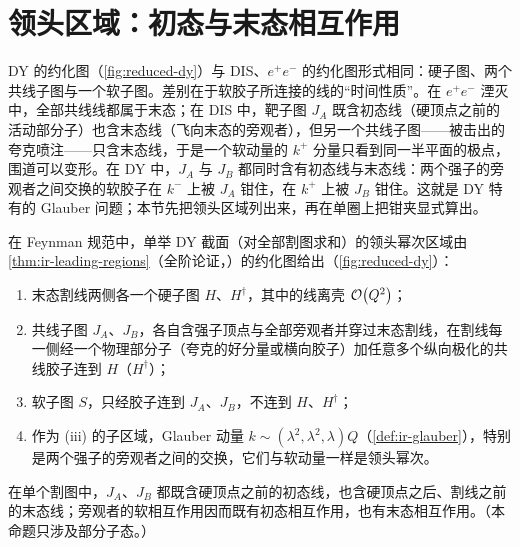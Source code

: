 \section{领头区域：初态与末态相互作用}\label{sec:dy-regions}

DY 的约化图（\cref{fig:reduced-dy}）与 DIS、$e^+e^-$ 的约化图形式相同：硬子图、两个共线子图与一个软子图。差别在于软胶子所连接的线的“时间性质”。在 $e^+e^-$ 湮灭中，全部共线线都属于末态；在 DIS 中，靶子图 $J_A$ 既含初态线（硬顶点之前的活动部分子）也含末态线（飞向末态的旁观者），但另一个共线子图——被击出的夸克喷注——只含末态线，于是一个软动量的 $k^+$ 分量只看到同一半平面的极点，围道可以变形。在 DY 中，$J_A$ 与 $J_B$ 都同时含有初态线与末态线：两个强子的旁观者之间交换的软胶子在 $k^-$ 上被 $J_A$ 钳住，在 $k^+$ 上被 $J_B$ 钳住。这就是 DY 特有的 Glauber 问题；本节先把领头区域列出来，再在单圈上把钳夹显式算出。

\begin{proposition}\label{prop:dy-regions}
在 Feynman 规范中，单举 DY 截面（对全部割图求和）的领头幂次区域由\cref{thm:ir-leading-regions}（全阶论证，\tagA）的约化图给出（\cref{fig:reduced-dy}）：
\begin{enumerate}[label=(\roman*),leftmargin=2.2em,itemsep=1pt,topsep=2pt]
\item 末态割线两侧各一个硬子图 $H$、$H^\dagger$，其中的线离壳 $\mathcal{O}\!\left(Q^2\right)$；
\item 共线子图 $J_A$、$J_B$，各自含强子顶点与全部旁观者并穿过末态割线，在割线每一侧经一个物理部分子（夸克的好分量或横向胶子）加任意多个纵向极化的共线胶子连到 $H$（$H^\dagger$）；
\item 软子图 $S$，只经胶子连到 $J_A$、$J_B$，不连到 $H$、$H^\dagger$；
\item 作为 (iii) 的子区域，Glauber 动量 $k\sim(\lambda^2,\lambda^2,\lambda)Q$（\cref{def:ir-glauber}），特别是两个强子的旁观者之间的交换，它们与软动量一样是领头幂次。
\end{enumerate}
在单个割图中，$J_A$、$J_B$ 都既含硬顶点之前的初态线，也含硬顶点之后、割线之前的末态线；旁观者的软相互作用因而既有初态相互作用，也有末态相互作用。（本命题只涉及部分子态。）
\end{proposition}

